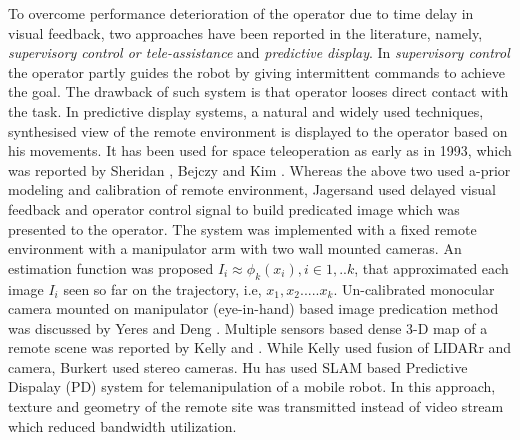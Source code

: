 To overcome performance deterioration of the operator due to time delay in visual feedback, two approaches have been reported in the literature, namely, \textit{supervisory control or tele-assistance  } and \textit{predictive display}. In \textit{supervisory control} \cite{sheridan1986human,pook1994teleassistance,jagersand1995visual} the operator partly guides the  robot by giving intermittent  commands to achieve the goal. The drawback of such system is that operator looses direct contact with the task.
In  predictive display systems, a natural and widely used techniques, synthesised view of the remote environment is displayed to the operator based on his movements. It has been used for space teleoperation as early as in 1993, which was reported by Sheridan \cite{sheridan1993space}, Bejczy \cite{bejczy1990predictive} and Kim \cite{kim1993demonstration}. Whereas the above two used a-prior modeling and  calibration of remote environment, Jagersand \cite{jagersand1999image} used delayed visual feedback and operator control signal to build predicated image which was presented to the operator. The system was implemented with a fixed remote environment with a manipulator arm with  two wall mounted cameras. An estimation function was proposed 
$I_i \approx \phi_k(x_i), i \in {1,..k}$, that approximated each image  $I_i$ seen so far on the trajectory, i.e, ${x_1, x_2 .....x_k}$. Un-calibrated monocular camera mounted on manipulator (eye-in-hand) based image predication method was discussed   by Yeres \cite{yerex2003predictive} and Deng \cite{deng2003predictive}. Multiple sensors based dense 3-D  map of a remote scene was reported by Kelly \cite{kelly2011real} and \cite{burkert2004photorealistic}. While Kelly used fusion of  LIDARr and  camera,  Burkert used stereo cameras. Hu \cite{hu2015line} has used SLAM based Predictive Dispalay  (PD) system for telemanipulation of a mobile robot. In this approach, texture and geometry of the remote site was transmitted instead of  video stream which reduced bandwidth utilization.







